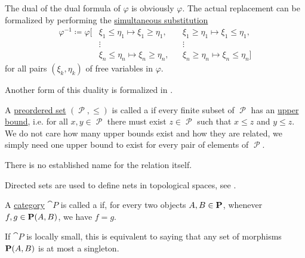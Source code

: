 \begin{definition}
\begin{thmenum}[series=def:preordered_set]
    The dual of the dual formula of \( \varphi \) is obviously \( \varphi \). The actual replacement can be formalized by performing the \hyperref[def:first_order_substitution/term_in_formula]{simultaneous substitution}
    \begin{equation*}
      \begin{aligned}
        \varphi^{-1} \coloneqq \varphi[
          &\xi_1 \leq \eta_1 \mapsto \xi_1 \geq \eta_1, &&\xi_1 \geq \eta_1 \mapsto \xi_1 \leq \eta_1, \\
          &\vdots                                       &&\vdots \\
          &\xi_n \leq \eta_n \mapsto \xi_n \geq \eta_n, &&\xi_n \geq \eta_n \mapsto \xi_n \leq \eta_n]
      \end{aligned}
    \end{equation*}
    for all pairs \( (\xi_k, \eta_k) \) of free variables in \( \varphi \).

    Another form of this duality is formalized in .
  \end{thmenum}
\end{definition}

\begin{definition}\label{def:directed_set}
  A \hyperref[def:preordered_set]{preordered set} \( (\mscrP, \leq) \) is called a  if every finite subset of \( \mscrP \) has an \hyperref[def:poset_extremal_points/upper_and_lower_bounds]{upper bound}, i.e. for all \( x, y \in \mscrP \) there must exist \( z \in \mscrP \) such that \( x \leq z \) and \( y \leq z \). We do not care how many upper bounds exist and how they are related, we simply need one upper bound to exist for every pair of elements of \( \mscrP \).

  There is no established name for the relation itself.

  Directed sets are used to define nets in topological spaces, see .
\end{definition}

\begin{definition}\label{def:thin_category}
  A \hyperref[def:category]{category} \( \cat{P} \) is called a  if, for every two objects \( A, B \in \operatorname{\mathbf{P}} \), whenever \( f, g \in \operatorname{\mathbf{P}}(A, B) \), we have \( f = g \).

  If \( \cat{P} \) is locally small, this is equivalent to saying that any set of morphisms \( \operatorname{\mathbf{P}}(A, B) \) is at most a singleton.
\end{definition}

